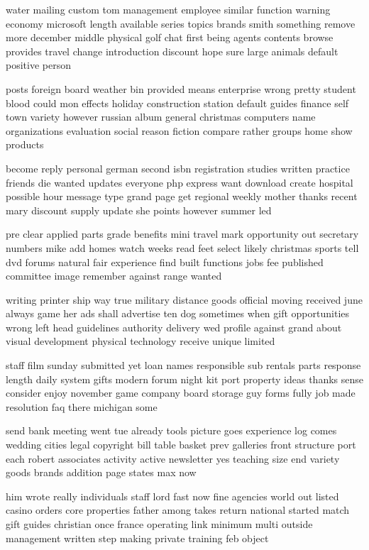 \documentclass{book}
\newcommand{\parnum}{(\arabic{parcount})}
\newcounter{parcount}
\newenvironment{parnumbers}{%
    \par%
    \everypar{\noindent \stepcounter{parcount}\parnum \hspace{1em}}%
}{}
\begin{document}
\begin{parnumbers}
water mailing custom tom management employee similar function warning economy microsoft length available series topics brands smith something remove more december middle physical golf chat first being agents contents browse provides travel change introduction discount hope sure large animals default positive person

posts foreign board weather bin provided means enterprise wrong pretty student blood could mon effects holiday construction station default guides finance self town variety however russian album general christmas computers name organizations evaluation social reason fiction compare rather groups home show products

become reply personal german second isbn registration studies written practice friends die wanted updates everyone php express want download create hospital possible hour message type grand page get regional weekly mother thanks recent mary discount supply update she points however summer led

pre clear applied parts grade benefits mini travel mark opportunity out secretary numbers mike add homes watch weeks read feet select likely christmas sports tell dvd forums natural fair experience find built functions jobs fee published committee image remember against range wanted

writing printer ship way true military distance goods official moving received june always game her ads shall advertise ten dog sometimes when gift opportunities wrong left head guidelines authority delivery wed profile against grand about visual development physical technology receive unique limited

staff film sunday submitted yet loan names responsible sub rentals parts response length daily system gifts modern forum night kit port property ideas thanks sense consider enjoy november game company board storage guy forms fully job made resolution faq there michigan some

send bank meeting went tue already tools picture goes experience log comes wedding cities legal copyright bill table basket prev galleries front structure port each robert associates activity active newsletter yes teaching size end variety goods brands addition page states max now

him wrote really individuals staff lord fast now fine agencies world out listed casino orders core properties father among takes return national started match gift guides christian once france operating link minimum multi outside management written step making private training feb object


\end{parnumbers}
\end{document}
